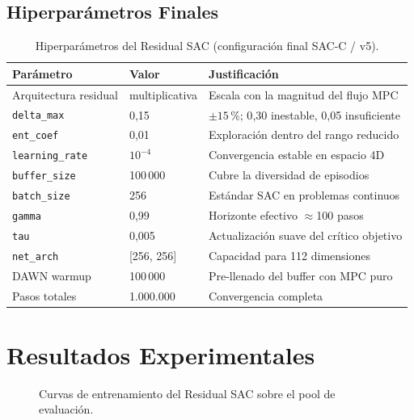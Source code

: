 \documentclass[12pt, a4paper, twoside]{report}
\begin{document}
\subsection{Hiperparámetros Finales}

\begin{table}[H]
\centering
\caption{Hiperparámetros del Residual SAC (configuración final SAC-C / v5).}
\label{tab:hyperparams}
\begin{tabularx}{\textwidth}{lll}
\toprule
\textbf{Parámetro} & \textbf{Valor} & \textbf{Justificación} \\
\midrule
Arquitectura residual & multiplicativa & Escala con la magnitud del flujo MPC \\
\texttt{delta\_max} & 0{,}15 & $\pm15\,\%$; 0{,}30 inestable, 0{,}05 insuficiente \\
\texttt{ent\_coef} & 0{,}01 & Exploración dentro del rango reducido \\
\texttt{learning\_rate} & $10^{-4}$ & Convergencia estable en espacio 4D \\
\texttt{buffer\_size} & 100\,000 & Cubre la diversidad de episodios \\
\texttt{batch\_size} & 256 & Estándar SAC en problemas continuos \\
\texttt{gamma} & 0{,}99 & Horizonte efectivo $\approx$100 pasos \\
\texttt{tau} & 0{,}005 & Actualización suave del crítico objetivo \\
\texttt{net\_arch} & [256, 256] & Capacidad para 112 dimensiones \\
DAWN warmup & 100\,000 & Pre-llenado del buffer con MPC puro \\
Pasos totales & 1.000.000 & Convergencia completa \\
\bottomrule
\end{tabularx}
\end{table}

\section{Resultados Experimentales}
\label{sec:resultados}

\begin{figure}[H]
  \centering
  \caption{Curvas de entrenamiento del Residual SAC sobre el pool de evaluación.}
  \label{fig:curvas_sac}
\end{figure}
\end{document}
